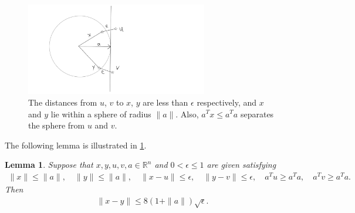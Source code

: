 \documentclass{article}
\newtheorem{lemma}[theorem]{Lemma}
\theoremstyle{case}
\numberwithin{theorem}{subsection}
\newcommand{\Rn}{\mathbb R^n}
\begin{document}
\begin{figure}[ht]
	\centering
	\includegraphics[width=300px]{images/first_lemma.png}
	\caption{
		The distances from $u$, $v$ to $x$, $y$ are less than $\epsilon$ respectively, and $x$ and $y$ lie within a sphere of radius $\|a\|$.
		Also, $a^Tx \le a^Ta$ separates the sphere from $u$ and $v$.
	}
	\label{first_lemma}
\end{figure}
The following lemma is illustrated in \cref{first_lemma}.
\begin{lemma}
\label{properties_of_a_circle}
Suppose that $x, y, u, v, a \in \Rn$ and $0 < \epsilon \le 1$ are given satisfying
\begin{align*}
\|x\| \le \|a\|, \quad
\|y \| \le \|a\|, \quad
\|x - u \| \le \epsilon, \quad
\|y - v \| \le \epsilon, \quad
a^T u \ge a^T a, \quad
a^T v \ge a^T a.
\end{align*}
Then
\begin{align*}
\|x - y\| \le 8(1 + \|a\|) \sqrt{\epsilon}.
\end{align*}
\end{lemma}
\end{document}
